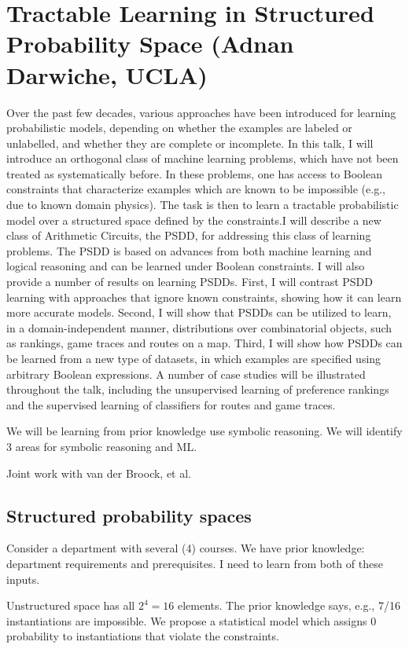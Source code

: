 \section{Tractable Learning in Structured Probability Space (Adnan Darwiche, UCLA)}

Over the past few decades, various approaches have been introduced for learning probabilistic models, depending on whether the examples are labeled or unlabelled, and whether they are complete or incomplete. In this talk, I will introduce an orthogonal class of machine learning problems, which have not been treated as systematically before. In these problems, one has access to Boolean constraints that characterize examples which are known to be impossible (e.g., due to known domain physics). The task is then to learn a tractable probabilistic model over a structured space defined by the constraints.I will describe a new class of Arithmetic Circuits, the PSDD, for addressing this class of learning problems. The PSDD is based on advances from both machine learning and logical reasoning and can be learned under Boolean constraints. I will also provide a number of results on learning PSDDs. First, I will contrast PSDD learning with approaches that ignore known constraints, showing how it can learn more accurate models. Second, I will show that PSDDs can be utilized to learn, in a domain-independent manner, distributions over combinatorial objects, such as rankings, game traces and routes on a map. Third, I will show how PSDDs can be learned from a new type of datasets, in which examples are specified using arbitrary Boolean expressions. A number of case studies will be illustrated throughout the talk, including the unsupervised learning of preference rankings and the supervised learning of classifiers for routes and game traces.

We will be learning from prior knowledge use  symbolic reasoning. We will identify 3 areas for symbolic reasoning and ML.

Joint work with van der Broock, et al.
\subsection{Structured probability spaces}

Consider a department with several (4) courses. We have prior knowledge: department requirements and prerequisites. I need to learn from both of these inputs.

Unstructured space has all $2^4=16$ elements. The prior knowledge says, e.g.,  7/16 instantiations are impossible.
We propose a statistical model which assigns 0 probability to instantiations that violate the constraints.

